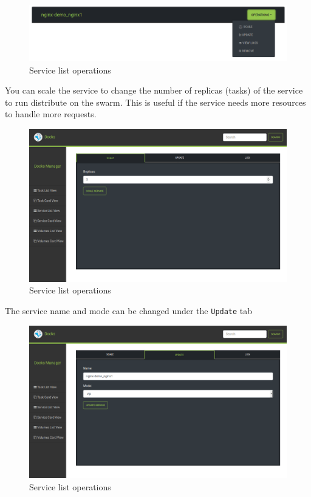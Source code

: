 \documentclass[]{article}
\let\oldtexttt\texttt
\renewcommand{\texttt}[1]{
	\colorbox{Light}{\oldtexttt{#1}}
}
\begin{document}
\begin{figure}[H]
	\centering
	\includegraphics[scale=0.4]{service_list_operations.png}
	\caption{Service list operations}
\end{figure}

You can scale the service to change the number of replicas (tasks) of the service to run distribute on the swarm.
This is useful if the service needs more resources to handle more requests.

\begin{figure}[H]
	\centering
	\includegraphics[scale=0.4]{service_list_scale.png}
	\caption{Service list operations}
\end{figure}

The service name and mode can be changed under the \texttt{Update} tab
\begin{figure}[H]
	\centering
	\includegraphics[scale=0.4]{service_list_update.png}
	\caption{Service list operations}
\end{figure}
\end{document}
